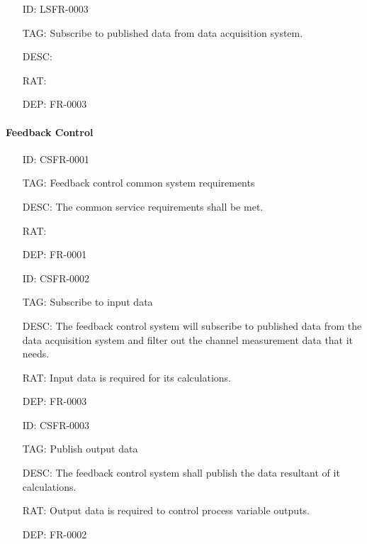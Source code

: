         \begin{itemize}
          \setlength{\itemindent}{.5in}
          \itemsep .15em
          \item[ID:] LSFR-0003
          \item[TAG:] Subscribe to published data from data acquisition system.
          \item[DESC:]
          \item[RAT:]
          \item[DEP:] FR-0003
        \end{itemize}

      \paragraph{Feedback Control}

        \begin{itemize}
          \setlength{\itemindent}{.5in}
          \itemsep .15em
          \item[ID:] CSFR-0001
          \item[TAG:] Feedback control common system requirements
          \item[DESC:] The common service requirements shall be met.
          \item[RAT:]
          \item[DEP:] FR-0001
        \end{itemize}

        \begin{itemize}
          \setlength{\itemindent}{.5in}
          \itemsep .15em
          \item[ID:] CSFR-0002
          \item[TAG:] Subscribe to input data
          \item[DESC:] The feedback control system will subscribe to
            published data from the data acquisition system and filter out
            the channel measurement data that it needs.
          \item[RAT:] Input data is required for its calculations.
          \item[DEP:] FR-0003
        \end{itemize}

        \begin{itemize}
          \setlength{\itemindent}{.5in}
          \itemsep .15em
          \item[ID:] CSFR-0003
          \item[TAG:] Publish output data
          \item[DESC:] The feedback control system shall publish the data
            resultant of it calculations.
          \item[RAT:] Output data is required to control process variable
            outputs.
          \item[DEP:] FR-0002
        \end{itemize}

